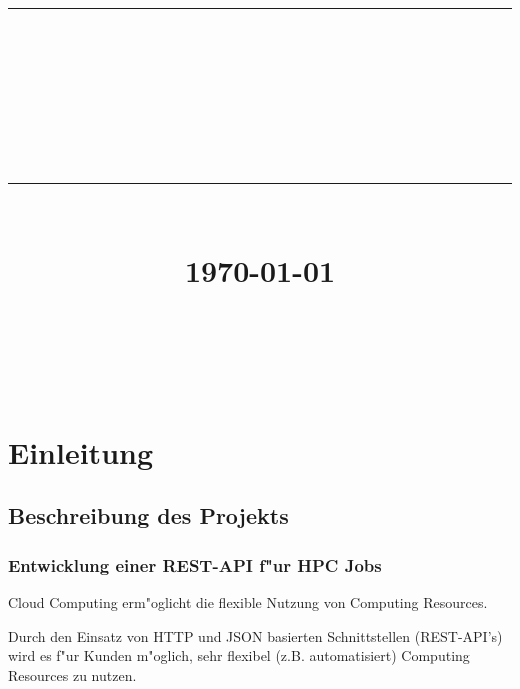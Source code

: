 \documentclass[12pt]{article}
\newcommand{\HRule}[1]{\rule{\linewidth}{#1}}
\begin{document}
\title{ \normalsize
  \HRule{0.5pt} \\
  \LARGE \textbf{\uppercase{\newCommandDiscipline}} \\
  \smallbreak
  \small\textbf{{\newCommandTerm}}\\
  \HRule{2pt} \\ [0.5cm]
  \normalsize \today \vspace*{10\baselineskip}}

\date{}

\author{
  \newCommandName \\
  \newCommandMatriculationNumber \\
  \newCommandUniversity \\
  \newCommandFaculty
}


\maketitle

\thispagestyle{empty}
\newpage
\tableofcontents
\setcounter{page}{1}

\newpage

\sectionfont{\scshape}


\section{Einleitung}
\subsection{Beschreibung des Projekts}

\subsubsection{Entwicklung einer REST-API f"ur HPC Jobs}
Cloud Computing erm"oglicht die flexible Nutzung von Computing Resources.

Durch den Einsatz von HTTP und JSON basierten Schnittstellen (REST-API's) wird es f"ur Kunden m"oglich, sehr flexibel (z.B. automatisiert) Computing Resources zu nutzen.
\end{document}

